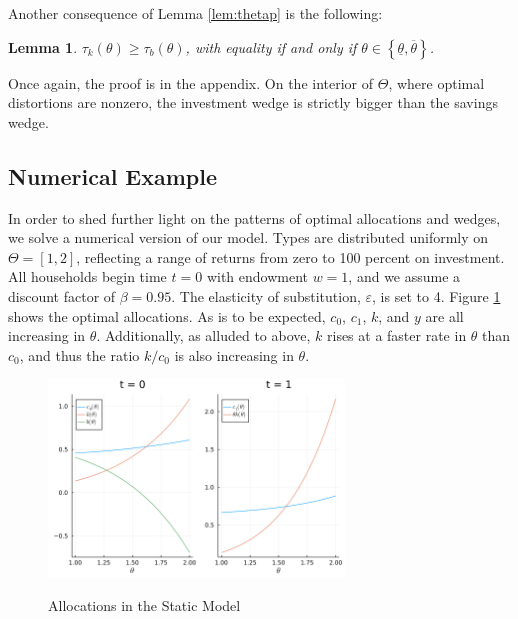 \documentclass[11pt]{article}
\newtheorem{lemma}{Lemma}
\begin{document}
Another consequence of Lemma \ref{lem:thetap} is the following: 
\begin{lemma} \label{lem:tauk_bigger}
    \( \tau_{k}\left(\theta\right)\ge\tau_{b}\left(\theta\right) \), with equality if and only if \( \theta\in\left\{ \underline{\theta},\overline{\theta}\right\}  \).
\end{lemma}
Once again, the proof is in the appendix. On the interior of \( \Theta \), where optimal distortions are nonzero, the investment wedge is strictly bigger than the savings wedge. 

\subsection{Numerical Example}

In order to shed further light on the patterns of optimal allocations and wedges, we solve a numerical version of our model. Types are distributed uniformly on \( \Theta = [1,2] \), reflecting a range of returns from zero to 100 percent on investment. All households begin time \( t=0 \) with endowment \( w = 1 \), and we assume a discount factor of \( \beta = 0.95 \). The elasticity of substitution, \( \varepsilon \), is set to 4. Figure \ref{fig:static_allocs} shows the optimal allocations. As is to be expected, \( c_0 \), \( c_1 \), \( k \), and \( y \) are all increasing in \( \theta \). Additionally, as alluded to above, \( k \) rises at a faster rate in \( \theta \) than \( c_0 \), and thus the ratio \( k/c_0 \) is also increasing in \( \theta \). 
\begin{figure}[htbp]
    \centering
    \caption{Allocations in the Static Model}
    \includegraphics[width = 0.7\textwidth]{figures/allocations.png}
    \label{fig:static_allocs}
\end{figure}
\end{document}
